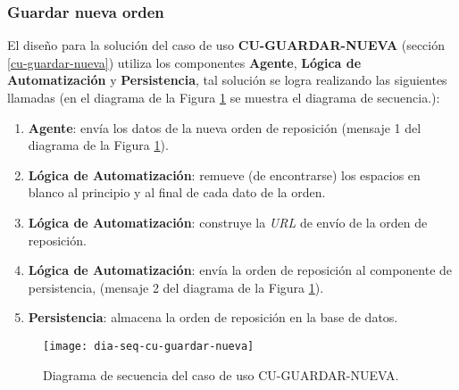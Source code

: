 \subsubsection{Guardar nueva orden}
El diseño para la solución del caso de uso \textbf{CU-GUARDAR-NUEVA} (sección \ref{cu-guardar-nueva}) utiliza los componentes \textbf{Agente}, \textbf{Lógica de Automatización} y \textbf{Persistencia}, tal solución se logra realizando las siguientes llamadas (en el diagrama de la Figura \ref{fig:dia-seq-cu-guardar-nueva} se muestra el diagrama de secuencia.):
\begin{enumerate}
	\item \textbf{Agente}: envía los datos de la nueva orden de reposición (mensaje 1 del diagrama de la Figura \ref{fig:dia-seq-cu-guardar-nueva}).
	\item \textbf{Lógica de Automatización}: remueve (de encontrarse) los espacios en blanco al principio y al final de cada dato de la orden.
	\item \textbf{Lógica de Automatización}: construye la \textit{URL} de envío de la orden de reposición.
	\item \textbf{Lógica de Automatización}: envía la orden de reposición al componente de persistencia, (mensaje 2 del diagrama de la Figura \ref{fig:dia-seq-cu-guardar-nueva}).
	\item \textbf{Persistencia}: almacena la orden de reposición en la base de datos.
\end{enumerate}

\begin{figure}[h]
	\centering
	\texttt{[image: dia-seq-cu-guardar-nueva]}
	\caption{Diagrama de secuencia del caso de uso CU-GUARDAR-NUEVA.}
	\label{fig:dia-seq-cu-guardar-nueva}
\end{figure}

